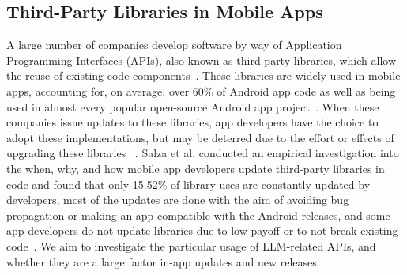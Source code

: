 


\subsection{Third-Party Libraries in Mobile Apps}
A large number of companies develop software by way of Application Programming Interfaces (APIs), also known as third-party libraries, which allow the reuse of existing code components~\cite{wang2017understanding}. These libraries are widely used in mobile apps, accounting for, on average, over 60\% of Android app code as well as being used in almost every popular open-source Android app project~\cite{wang2017understanding, polese2022adoption}. When these companies issue updates to these libraries, app developers have the choice to adopt these implementations, but may be deterred due to the effort or effects of upgrading these libraries ~\cite{ahasanuzzaman2020studying}. %
Salza et al. conducted an empirical investigation into the when, why, and how mobile app developers update third-party libraries in code and found that only 15.52\% of library uses are constantly updated by developers, most of the updates are done with the aim of avoiding bug propagation or making an app compatible with the Android releases, and some app developers do not update libraries due to low payoff or to not break existing code~\cite{salza2020third}. We aim to investigate the particular usage of LLM-related APIs, and whether they are a large factor in-app updates and new releases.



